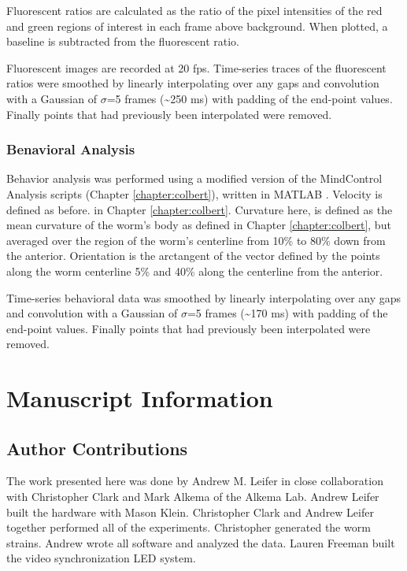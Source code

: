 Fluorescent ratios are calculated as the ratio of the pixel intensities of the red and green regions of interest in each frame above background. When plotted, a baseline is subtracted from the fluorescent ratio.
 
Fluorescent images are recorded at 20 fps. Time-series traces of the fluorescent ratios were smoothed by linearly interpolating over any gaps and convolution with a Gaussian of $\sigma$=5 frames (\textasciitilde 250 ms) with padding of the end-point values. Finally points that had previously been interpolated were removed.


\subsubsection{Benavioral Analysis}
Behavior analysis was performed using a modified version of the MindControl Analysis scripts (Chapter \ref{chapter:colbert}), written in MATLAB \citep{matlab_version_2010}. Velocity is defined as before. in Chapter \ref{chapter:colbert}. Curvature here, is defined as the mean curvature of the worm's body as defined in Chapter \ref{chapter:colbert}, but averaged over the region of the worm's centerline from 10\%  to 80\% down from the anterior. Orientation is the arctangent of the vector defined by the points along the worm centerline 5\% and 40\% along the centerline from the anterior.


Time-series behavioral data was smoothed by linearly interpolating over any gaps and convolution with a Gaussian of $\sigma$=5 frames (\textasciitilde 170 ms) with padding of the end-point values. Finally points that had previously been interpolated were removed.



\section{Manuscript Information}
\subsection{Author Contributions}
The work presented here was done by Andrew M. Leifer in close collaboration with Christopher Clark and Mark Alkema of the Alkema Lab. Andrew Leifer built the hardware with Mason Klein. Christopher Clark and Andrew Leifer together performed all of the experiments. Christopher generated the worm strains. Andrew wrote all software and analyzed the data. Lauren Freeman built the video synchronization LED system. 

